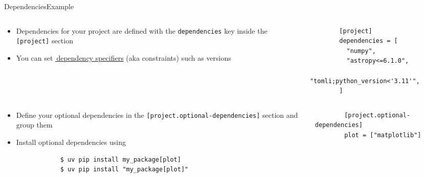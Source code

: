 \begin{splitframe}[fragile]{Dependencies}{Example}
  \begin{columns}[t,onlytextwidth]
    \begin{column}{0.58\textwidth}
      \begin{itemize}
        \setlength{\itemsep}{1em}
        \item Dependencies for your project are defined with the \texttt{dependencies}
          key inside the \texttt{[project]} section
        \item You can set \href{https://packaging.python.org/en/latest/specifications/dependency-specifiers/}{{\footnotesize{\faExternalLink*}}\,dependency specifiers}
          (aka constraints) such as versions
      \end{itemize}
    \end{column}
    \hfill
    \begin{column}{0.38\textwidth}
      \begin{verbatim}
        [project]
        dependencies = [
          "numpy",
          "astropy<=6.1.0",
          "tomli;python_version<'3.11'",
        ]
      \end{verbatim}
    \end{column}
  \end{columns}
  \vspace{1em}
  \begin{columns}[t,onlytextwidth]
    \begin{column}{0.58\textwidth}
      \begin{itemize}
        \setlength{\itemsep}{1em}
        \item Define your optional dependencies in the \texttt{[project.optional-dependencies]} section
          and group them
        \item Install optional dependencies using
          {
          \begin{verbatim}
            $ uv pip install my_package[plot]
            $ uv pip install "my_package[plot]"
          \end{verbatim}
          }
      \end{itemize}
    \end{column}
    \hfill
    \begin{column}{0.38\textwidth}
      \begin{verbatim}
        [project.optional-dependencies]
        plot = ["matplotlib"]
      \end{verbatim}
    \end{column}
  \end{columns}
  \vspace{1em}
\end{splitframe}

